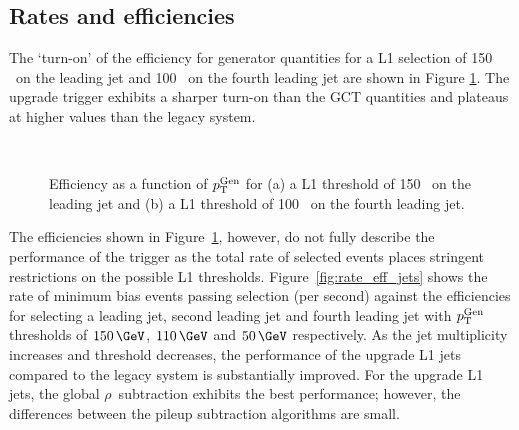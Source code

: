 \subsection{Rates and efficiencies}

The `turn-on' of the efficiency for generator quantities for a L1 selection of 150 \GeV~on the leading jet
and 100 \GeV~on the fourth leading jet are shown in Figure \ref{fig:turnon}. The upgrade trigger exhibits a sharper turn-on
than the GCT quantities and plateaus at higher values than the legacy system. 

\begin{figure}
    \begin{center} 
	~
	\caption{Efficiency as a function of ${p_{\text T}^{\text{Gen}}}$ for (a) a L1 threshold of 150 \GeV~on the leading jet and (b) 
	a L1 threshold of 100 \GeV~on the fourth leading jet.}
	    \label{fig:turnon}
    \end{center} 
\end{figure}

The efficiencies shown in Figure~\ref{fig:turnon}, however, do not fully describe the performance 
of the trigger as the total rate of selected events places 
stringent restrictions on the possible L1 thresholds. Figure~\ref{fig:rate_eff_jets} shows the rate of 
minimum bias events passing selection (per second) against the efficiencies for selecting 
a leading jet, second leading jet and fourth leading jet with ${p_{\text T}^{\text{Gen}}}$ thresholds of $150\,\GeV$,
$110\,\GeV$ and $50\,\GeV$ respectively. As the jet multiplicity increases and threshold decreases,
the performance of the upgrade L1 jets compared to the legacy system is substantially improved.
For the upgrade L1 jets, the global $\rho$~subtraction exhibits the best performance; however, the differences 
between the pileup subtraction algorithms are small.

